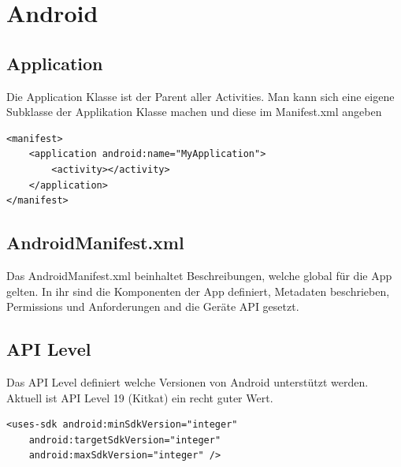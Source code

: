 


\newcommand{\SUBJECT}{Zusammenfassung}
\newcommand{\TITLE}{Mobile and GUI Engineering}




\section{Android}
\subsection{Application}
Die Application Klasse ist der Parent aller Activities. Man kann sich eine eigene Subklasse der Applikation Klasse machen und diese im Manifest.xml angeben
\begin{lstlisting}[caption=Custom Application Class]
<manifest>
	<application android:name="MyApplication">
		<activity></activity>
	</application>	
</manifest>
\end{lstlisting}

\subsection{AndroidManifest.xml}
Das AndroidManifest.xml beinhaltet Beschreibungen, welche global für die App gelten. In ihr sind die Komponenten der App definiert, Metadaten beschrieben, Permissions und Anforderungen and die Geräte API gesetzt. 

\subsection{API Level}
Das API Level definiert welche Versionen von Android unterstützt werden. Aktuell ist API Level 19 (Kitkat) ein recht guter Wert. 
\begin{lstlisting}[caption=API Level Declaration]
<uses-sdk android:minSdkVersion="integer"
	android:targetSdkVersion="integer"
	android:maxSdkVersion="integer" />
\end{lstlisting}

